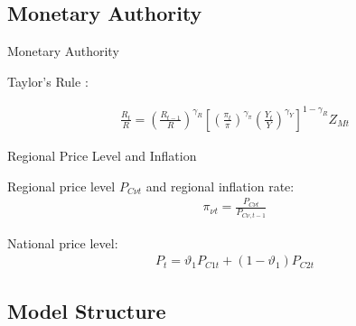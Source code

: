 \documentclass[
presentation.tex
]{subfiles}
\begin{document}

\subsection{Monetary Authority}

\begin{frame}{Monetary Authority}
	
	Taylor's Rule \cite{taylor_discretion_1993}:
	
	\begin{align}
		\frac{R_t}{R} =
		\left( \frac{R_{t-1}}{R} \right)^{\gamma_R}  \left[
		\left( \frac{\pi_t}{\pi} \right)^{\gamma_\pi}
		\left( \frac{Y_t}{Y} \right)^{\gamma_Y} \right]^{1-\gamma_R} Z_{Mt}
	\end{align}	
	
	
\end{frame}


\begin{frame}{Regional Price Level and Inflation}
	
	Regional price level $P_{C\nu t}$ and regional inflation rate:
	\begin{align}
		\pi_{\nu t} = \frac{P_{C\nu t}}{P_{C\nu, t-1}} \label{eq:regional-inflation}
	\end{align}
	
	National price level:
	\begin{align}
		P_t = \vartheta_1 P_{C1 t} + (1 -\vartheta_1) P_{C2 t}
		\label{eq:national-price-level}
	\end{align}
	
	
	
\end{frame}


\subsection{Model Structure}
\end{document}

